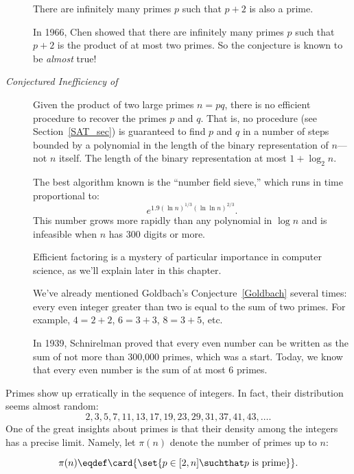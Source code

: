 \begin{description}

\item[] There are infinitely many primes
  $p$ such that $p + 2$ is also a prime.

  In 1966, Chen showed that there are infinitely many primes $p$ such
  that $p + 2$ is the product of at most two primes.  So the
  conjecture is known to be \emph{almost} true!

\item[\emph{Conjectured Inefficiency of }] Given the
  product of two large primes $n = pq$, there is no efficient
  procedure to recover the primes $p$ and $q$.  That is, no
  \emph{} procedure (see Section~\ref{SAT_sec})
  is guaranteed to find $p$ and $q$ in a number of steps bounded by a
  polynomial in the length of the binary representation of $n$---not
  $n$ itself.  The length of the binary representation at most
  $1+\log_2 n$.

  The best algorithm known is the ``number field sieve,'' which runs
  in time proportional to:
  \[
  e^{1.9(\ln n)^{1/3} (\ln\ln n)^{2/3}}.
  \]
  This number grows more rapidly than any polynomial in $\log n$ and
  is infeasible when $n$ has 300 digits or more.

  Efficient factoring is a mystery of particular importance in
  computer science, as we'll explain later in this chapter.

\item[\emph{}] We've already mentioned Goldbach's
  Conjecture~\ref{Goldbach} several times: every even integer greater
  than two is equal to the sum of two primes.  For example, $4 = 2 +
  2$, $6 = 3 + 3$, $8 = 3 + 5$, etc.

  In 1939, Schnirelman proved that every even number can be written as
  the sum of not more than 300,000 primes, which was a start.  Today,
  we know that every even number is the sum of at most 6 primes.
\end{description}

Primes show up erratically in the sequence of integers.  In fact,
their distribution seems almost random:
\[
2, 3, 5, 7, 11, 13, 17, 19, 23, 29, 31, 37, 41, 43, \dots.
\]
One of the great insights about primes is that their density among the
integers has a precise limit.  Namely, let $\pi(n)$ denote the number
of primes up to $n$:

\begin{definition}\label{def:prime<x}
\[
  \pi(n) \eqdef \card{\set{p \in [2, n] \suchthat p \text{ is
        prime}}}.
\]
\end{definition}

